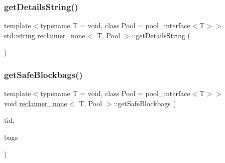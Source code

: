 \mbox{\label{classreclaimer__none_ab3504e7df5f9c56384a81ab042ef64dd}} 
\subsubsection{\texorpdfstring{get\+Details\+String()}{getDetailsString()}}
{\footnotesize\ttfamily template$<$typename T  = void, class Pool  = pool\+\_\+interface$<$\+T$>$$>$ \\
std\+::string \hyperlink{classreclaimer__none}{reclaimer\+\_\+none}$<$ T, Pool $>$\+::get\+Details\+String (\begin{DoxyParamCaption}{ }\end{DoxyParamCaption})\hspace{0.3cm}{\ttfamily [inline]}}

\mbox{\label{classreclaimer__none_a8d073432aa881a89b9729f63f47b74ec}} 
\subsubsection{\texorpdfstring{get\+Safe\+Blockbags()}{getSafeBlockbags()}}
{\footnotesize\ttfamily template$<$typename T  = void, class Pool  = pool\+\_\+interface$<$\+T$>$$>$ \\
void \hyperlink{classreclaimer__none}{reclaimer\+\_\+none}$<$ T, Pool $>$\+::get\+Safe\+Blockbags (\begin{DoxyParamCaption}\item[{const int}]{tid,  }\item[{\hyperlink{classblockbag}{blockbag}$<$ T $>$ $\ast$$\ast$}]{bags }\end{DoxyParamCaption})\hspace{0.3cm}{\ttfamily [inline]}}

\mbox{\label{classreclaimer__none_aea6c1a61f5891ca3f542f900165d0246}} 
